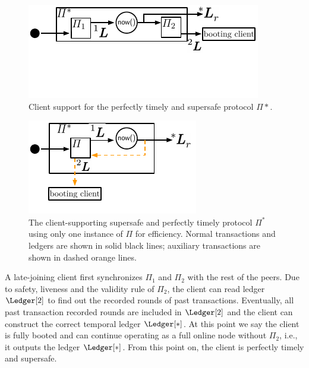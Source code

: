 \ifccs
  \begin{figure}[b]
    \centering
    \includegraphics[width=1\columnwidth,keepaspectratio]{figures/perfectly-timely-clients.pdf}
    \caption{Client support for the perfectly timely and supersafe protocol $\Pi*$.
    }
  \label{fig:client-support}
  \end{figure}
\fi

\ifccs
  \begin{figure}[b]
  \centering
  \includegraphics[width=0.75\columnwidth,keepaspectratio]{figures/perfectly-timely-clients-feedback.pdf}
  \caption{The client-supporting supersafe and perfectly timely protocol $\Pi^*$
            using only one instance of $\Pi$ for efficiency.
            Normal transactions and ledgers are shown in solid black lines;
            auxiliary transactions are shown in dashed
            orange lines.}
  \label{fig:client-support-feedback}
  \end{figure}
\fi

A late-joining client first synchronizes $\Pi_1$ and $\Pi_2$ with the rest
of the peers.
Due to safety, liveness and the validity rule of $\Pi_2$,
the client can read ledger $\Ledger[2]$ to find out the
recorded rounds of past transactions.
Eventually, all past transaction recorded rounds are included in $\Ledger[2]$
and the client can construct the correct temporal ledger $\Ledger[*]$.
At this point we say the client is fully booted and can continue
operating as a full online node without $\Pi_2$, i.e., it outputs the ledger $\Ledger[*]$.
From this point on, the client is perfectly timely and supersafe.

